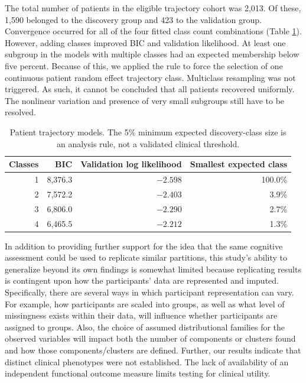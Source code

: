 The total number of patients in the eligible trajectory cohort was 2,013. Of these, 1,590 belonged to the discovery group and 423 to the validation group. Convergence occurred for all of the four fitted class count combinations (Table \ref{tab:extension_trajectories}). However, adding classes improved BIC and validation likelihood. At least one subgroup in the models with multiple classes had an expected membership below five percent. Because of this, we applied the rule to force the selection of one continuous patient random effect trajectory class. Multiclass resampling was not triggered. As such, it cannot be concluded that all patients recovered uniformly. The nonlinear variation and presence of very small subgroups still have to be resolved.

\begin{table}[htbp]
\centering\small
\caption{Patient trajectory models. The 5\% minimum expected discovery-class size is an analysis rule, not a validated clinical threshold.}
\label{tab:extension_trajectories}
\begin{tabular}{rrrr}
\toprule
Classes & BIC & Validation log likelihood & Smallest expected class \\
\midrule
1 & 8{,}376.3 & $-2.598$ & 100.0\% \\
2 & 7{,}572.2 & $-2.403$ & 3.9\% \\
3 & 6{,}806.0 & $-2.290$ & 2.7\% \\
4 & 6{,}465.5 & $-2.212$ & 1.3\% \\
\bottomrule
\end{tabular}
\end{table}

In addition to providing further support for the idea that the same cognitive assessment could be used to replicate similar partitions, this study's ability to generalize beyond its own findings is somewhat limited because replicating results is contingent upon how the participants' data are represented and imputed. Specifically, there are several ways in which participant representation can vary. For example, how participants are scaled into groups, as well as what level of missingness exists within their data, will influence whether participants are assigned to groups. Also, the choice of assumed distributional families for the observed variables will impact both the number of components or clusters found and how those components/clusters are defined. Further, our results indicate that distinct clinical phenotypes were not established. The lack of availability of an independent functional outcome measure limits testing for clinical utility.
